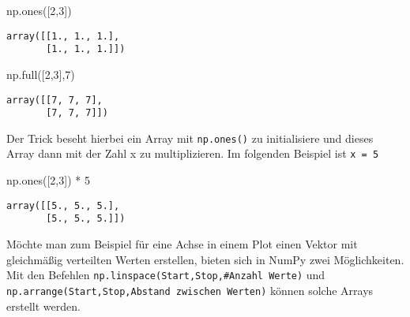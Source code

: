 \documentclass[
  letterpaper,
  DIV=11,
  numbers=noendperiod]{scrreprt}
\newenvironment{Shaded}{\begin{snugshade}}{\end{snugshade}}
\newcommand{\DecValTok}[1]{\textcolor[rgb]{0.68,0.00,0.00}{#1}}
\newcommand{\NormalTok}[1]{\textcolor[rgb]{0.00,0.23,0.31}{#1}}
\newcommand{\OperatorTok}[1]{\textcolor[rgb]{0.37,0.37,0.37}{#1}}
\begin{document}
\begin{tcolorbox}
\begin{Shaded}
\begin{Highlighting}[]
\NormalTok{np.ones([}\DecValTok{2}\NormalTok{,}\DecValTok{3}\NormalTok{])}
\end{Highlighting}
\end{Shaded}

\begin{verbatim}
array([[1., 1., 1.],
       [1., 1., 1.]])
\end{verbatim}

\begin{Shaded}
\begin{Highlighting}[]
\NormalTok{np.full([}\DecValTok{2}\NormalTok{,}\DecValTok{3}\NormalTok{],}\DecValTok{7}\NormalTok{)}
\end{Highlighting}
\end{Shaded}

\begin{verbatim}
array([[7, 7, 7],
       [7, 7, 7]])
\end{verbatim}

\begin{tcolorbox}[enhanced jigsaw, breakable, opacityback=0, left=2mm, coltitle=black, leftrule=.75mm, colframe=quarto-callout-tip-color-frame, opacitybacktitle=0.6, toprule=.15mm, bottomtitle=1mm, titlerule=0mm, toptitle=1mm, title=\textcolor{quarto-callout-tip-color}{\faLightbulb}\hspace{0.5em}{Wie könnte man auch Arrays die mit einer Zahl x gefühlt sind erstellen?}, colbacktitle=quarto-callout-tip-color!10!white, arc=.35mm, bottomrule=.15mm, rightrule=.15mm, colback=white]

Der Trick beseht hierbei ein Array mit \texttt{np.ones()} zu
initialisiere und dieses Array dann mit der Zahl x zu multiplizieren. Im
folgenden Beispiel ist \texttt{x\ =\ 5}

\begin{Shaded}
\begin{Highlighting}[]
\NormalTok{np.ones([}\DecValTok{2}\NormalTok{,}\DecValTok{3}\NormalTok{]) }\OperatorTok{*} \DecValTok{5}
\end{Highlighting}
\end{Shaded}

\begin{verbatim}
array([[5., 5., 5.],
       [5., 5., 5.]])
\end{verbatim}

\end{tcolorbox}

Möchte man zum Beispiel für eine Achse in einem Plot einen Vektor mit
gleichmäßig verteilten Werten erstellen, bieten sich in NumPy zwei
Möglichkeiten. Mit den Befehlen
\texttt{np.linspace(Start,Stop,\#Anzahl\ Werte)} und
\texttt{np.arrange(Start,Stop,Abstand\ zwischen\ Werten)} können solche
Arrays erstellt werden.


\end{tcolorbox}
\end{document}
